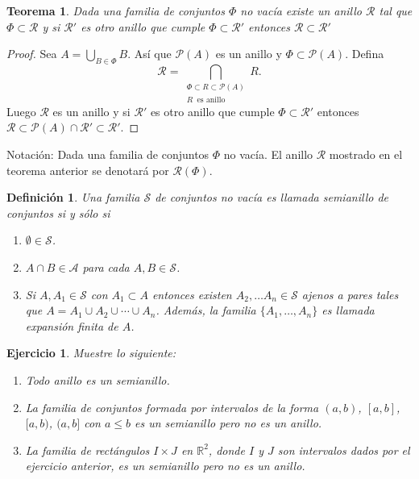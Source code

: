 \documentclass[twoside,12pt,a4 paper,openright]{book}
\newtheorem{teo}[claim]{Teorema}
\newtheorem{ejer}[claim]{Ejercicio}
\newtheorem{defi}[claim]{Definici\'on}
\begin{document}
\begin{teo}
Dada una familia de conjuntos $\Phi$ no vac\'ia existe un anillo $\mathcal R$ tal que  $\Phi \subset \mathcal R$ y si $\mathcal R' $ es otro anillo que cumple 
  $\Phi \subset \mathcal R'$ entonces  $ \mathcal R   \subset \mathcal R'$
\end{teo}
\begin{proof}
Sea $\displaystyle A=  \bigcup_{B\in \Phi} B$. As\'i que  $\mathcal P(A)$ es un anillo  y $\Phi \subset \mathcal P(A)$.  Defina 
$$\mathcal R = \bigcap_{ \begin{array}{c} \Phi \subset R  \subset \mathcal P(A)  \\ 
R \  \textrm{ es anillo }  \end{array} } R. 
$$
 Luego $\mathcal R$ es un anillo y si $\mathcal R' $ es otro anillo que cumple 
  $\Phi \subset \mathcal R'$  entonces $\mathcal R \subset \mathcal P(A)  \cap \mathcal R' \subset \mathcal R'$.
\end{proof}

Notaci\'on: Dada una familia de conjuntos $\Phi$ no vac\'ia. El anillo $\mathcal R$ mostrado en el teorema anterior se denotar\'a por $\mathcal R(\Phi)$.


\begin{defi}
Una familia $\mathcal S$ de conjuntos no vac\'ia es llamada semianillo de conjuntos si y s\'olo si 
\begin{enumerate}
\item  $\emptyset \in \mathcal S$.
\item  $A\cap B \in \mathcal A$ para cada $A,B\in \mathcal S$.
\item  Si $A, A_1 \in \mathcal S$ con $A_1 \subset A $ entonces existen $A_2, \dots A_n \in \mathcal S$ ajenos a pares  tales 	que $A= A_1\cup A_2 \cup \cdots \cup A_n$. Adem\'as, la familia $\{A_1,\dots, A_n\}$ es llamada expansi\'on finita de $A$.  
\end{enumerate}

\end{defi}





\begin{ejer}Muestre lo siguiente:
\begin{enumerate}
\item Todo anillo es un semianillo. 
\item   La familia de conjuntos formada por  intervalos de la forma $(a,b)$, $ [a,b]$,  $ [a,b)$,  $(a,b]$ con $a\leq b$ es un  semianillo pero no  es un anillo. 
\item La familia de rect\'angulos $I\times J$ en $\mathbb R^2$, donde $I$ y $J$ son intervalos  dados por el ejercicio anterior,  es un  semianillo pero no  es un anillo. 

\end{enumerate}
\end{ejer}
\end{document}
